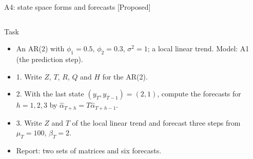 \begin{frame}{A4: state space forms and forecasts [Proposed]}
\propsub
\itemsize{\scriptsize}
\begin{columns}[T]
\begin{column}{\taskw}
\begin{block}{Task}
\begin{itemize}
    \item An AR(2) with $\phi_1 = 0.5$, $\phi_2 = 0.3$, $\sigma^2 = 1$; a local linear trend. Model: A1 (the prediction step).
    \item 1. Write $Z$, $T$, $R$, $Q$ and $H$ for the AR(2).
    \item 2. With the last state $(y_T, y_{T-1}) = (2, 1)$, compute the forecasts for $h = 1, 2, 3$ by $\hat\alpha_{T+h} = T\hat\alpha_{T+h-1}$.
    \item 3. Write $Z$ and $T$ of the local linear trend and forecast three steps from $\mu_T = 100$, $\beta_T = 2$.
    \item Report: two sets of matrices and six forecasts.
\end{itemize}
\end{block}
\end{column}
\begin{column}{\solw}
\end{column}
\end{columns}
\end{frame}

